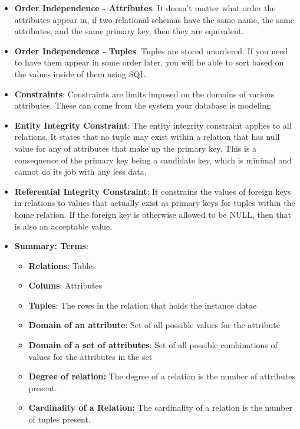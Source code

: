 \documentclass{report}
\begin{document}
\begin{itemize}
        \item \textbf{Order Independence - Attributes}: It doesn't matter what order the attributes appear in, if two relational schemas have the same name, the same attributes, and the same primary key, then they are equivalent.
        \item \textbf{Order Independence - Tuples}: Tuples are stored unordered. If you need to have them appear in some order later, you will be able to sort based on the values inside of them using SQL.
        \item \textbf{Constraints}: Constraints are limits imposed on the domains of various attributes. These can come from the system your database is modeling
        \item \textbf{Entity Integrity Constraint}: The entity integrity constraint applies to all relations. It states that no tuple may exist within a relation that has null value for any of attributes that make up the primary key. This is a consequence of the primary key being a candidate key, which is minimal and cannot do its job with any less data.
        \item \textbf{Referential Integrity Constraint}: It constrains the values of foreign keys in relations to values that actually exist as primary keys for tuples within the home relation. If the foreign key is otherwise allowed to be NULL, then that is also an acceptable value.
        \item \textbf{Summary: Terms}:
            \begin{itemize}
                \item \textbf{Relations}: Tables
                \item \textbf{Colums}: Attributes
                \item \textbf{Tuples}: The rows in the relation that holds the instance datae
                \item \textbf{Domain of an attribute}: Set of all possible values for the attribute
                \item \textbf{Domain of a set of attributes}: Set of all possible combinations of values for the attributes in the set
                \item \textbf{Degree of relation:} The degree of a relation is the number of attributes present.
                \item \textbf{Cardinality of a Relation:} The cardinality of a relation is the number of tuples present.
            \end{itemize}
    \end{itemize}
\end{document}
